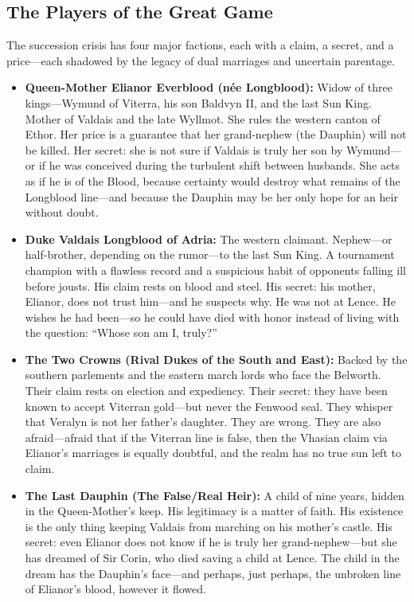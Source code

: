 \subsection*{The Players of the Great Game}

The succession crisis has four major factions, each with a claim, a secret, and a price---each shadowed by the legacy of dual marriages and uncertain parentage.

\begin{itemize}
  \item \textbf{Queen-Mother Elianor Everblood (née Longblood):} Widow of three kings---Wymund of Viterra, his son Baldvyn II, and the last Sun King. Mother of Valdais and the late Wyllmot. She rules the western canton of Ethor. Her price is a guarantee that her grand-nephew (the Dauphin) will not be killed. Her secret: she is not sure if Valdais is truly her son by Wymund---or if he was conceived during the turbulent shift between husbands. She acts as if he is of the Blood, because certainty would destroy what remains of the Longblood line---and because the Dauphin may be her only hope for an heir without doubt.
  \item \textbf{Duke Valdais Longblood of Adria:} The western claimant. Nephew---or half-brother, depending on the rumor---to the last Sun King. A tournament champion with a flawless record and a suspicious habit of opponents falling ill before jousts. His claim rests on blood and steel. His secret: his mother, Elianor, does not trust him---and he suspects why. He was not at Lence. He wishes he had been---so he could have died with honor instead of living with the question: ``Whose son am I, truly?''
  \item \textbf{The Two Crowns (Rival Dukes of the South and East):} Backed by the southern parlements and the eastern march lords who face the Belworth. Their claim rests on election and expediency. Their secret: they have been known to accept Viterran gold---but never the Fenwood seal. They whisper that Veralyn is not her father's daughter. They are wrong. They are also afraid---afraid that if the Viterran line is false, then the Vhasian claim via Elianor's marriages is equally doubtful, and the realm has no true sun left to claim.
  \item \textbf{The Last Dauphin (The False/Real Heir):} A child of nine years, hidden in the Queen-Mother's keep. His legitimacy is a matter of faith. His existence is the only thing keeping Valdais from marching on his mother's castle. His secret: even Elianor does not know if he is truly her grand-nephew---but she has dreamed of Sir Corin, who died saving a child at Lence. The child in the dream has the Dauphin's face---and perhaps, just perhaps, the unbroken line of Elianor's blood, however it flowed.
\end{itemize}

